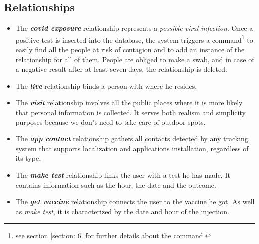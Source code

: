 \subsection{Relationships}
\begin{itemize}
    \item The \textit{\textbf{covid exposure}} relationship represents a \emph{possible viral infection}. Once a positive test is inserted into the database, the system triggers a command\footnote{see section \ref{section: 6} for further details about the command.} to easily find all the people at risk of contagion and to add an instance of the relationship for all of them. People are obliged to make a swab, and in case of a negative result after at least seven days, the relationship is deleted.
    \item The \textit{\textbf{live}} relationship binds a person with where he resides.
    \item The \textit{\textbf{visit}} relationship involves all the public places where it is more likely that personal information is collected. It serves both realism and simplicity purposes because we don't need to take care of outdoor spots.
    \item The \textit{\textbf{app contact}} relationship gathers all contacts detected by any tracking system that supports localization and applications installation, regardless of its type.
    \item The \textit{\textbf{make test}} relationship links the user with a test he has made. It contains information such as the hour, the date and the outcome.
    \item The \textit{\textbf{get vaccine}} relationship connects the user to the vaccine he got. As well as \emph{make test}, it is characterized by the date and hour of the injection.
\end{itemize}